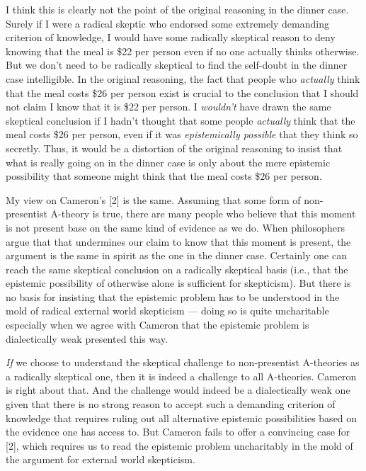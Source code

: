 \documentclass[a4paper,12pt]{article}
\begin{document}
I think this is clearly not the point of the original reasoning in the dinner case. Surely if I were a radical skeptic who endorsed some extremely demanding criterion of knowledge, I would have some radically skeptical reason to deny knowing that the meal is \$22 per person even if no one actually thinks otherwise. But we don't need to be radically skeptical to find the self-doubt in the dinner case intelligible. In the original reasoning, the fact that people who \emph{actually} think that the meal costs \$26 per person exist is crucial to the conclusion that I should not claim I know that it is \$22 per person. I \emph{wouldn't} have drawn the same skeptical conclusion if I hadn't thought that some people \emph{actually} think that the meal costs \$26 per person, even if it was \emph{epistemically possible} that they think so secretly. Thus, it would be a distortion of the original reasoning to insist that what is really going on in the dinner case is only about the mere epistemic possibility that someone might think that the meal costs \$26 per person.

My view on Cameron's [2] is the same. Assuming that some form of non-presentist A-theory is true, there are many people who believe that this moment is not present base on the same kind of evidence as we do. When philosophers argue that that undermines our claim to know that this moment is present, the argument is the same in spirit as the one in the dinner case. Certainly one can reach the same skeptical conclusion on a radically skeptical basis (i.e., that the epistemic possibility of otherwise alone is sufficient for skepticism). But there is no basis for insisting that the epistemic problem has to be understood in the mold of radical external world skepticism --- doing so is quite uncharitable especially when we agree with Cameron that the epistemic problem is dialectically weak presented this way.\footnotemark


\emph{If} we choose to understand the skeptical challenge to non-presentist A-theories as a radically skeptical one, then it is indeed a challenge to all A-theories. Cameron is right about that. And the challenge would indeed be a dialectically weak one given that there is no strong reason to accept such a demanding criterion of knowledge that requires ruling out all alternative epistemic possibilities based on the evidence one has access to. But Cameron fails to offer a convincing case for [2], which requires us to read the epistemic problem uncharitably in the mold of the argument for external world skepticism.
\end{document}

